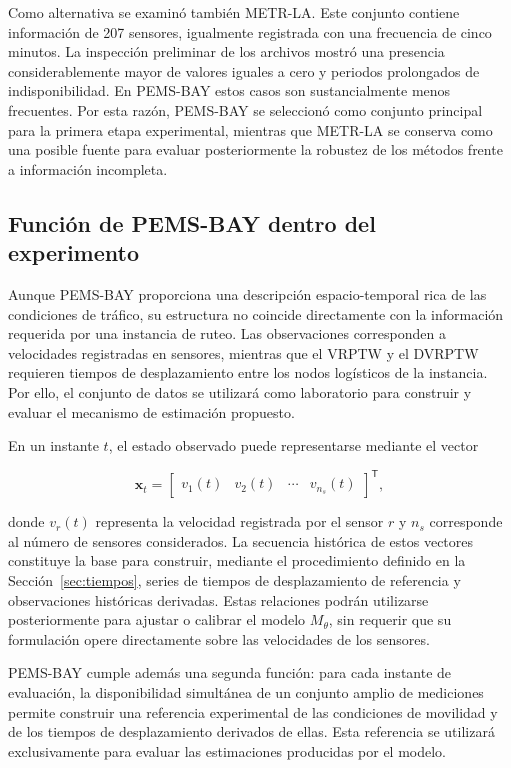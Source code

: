 \documentclass[11pt]{article}
\begin{document}
Como alternativa se examinó también METR-LA. Este conjunto contiene
información de 207 sensores, igualmente registrada con una frecuencia de
cinco minutos. La inspección preliminar de los archivos mostró una presencia
considerablemente mayor de valores iguales a cero y periodos prolongados de
indisponibilidad. En PEMS-BAY estos casos son sustancialmente menos frecuentes.
Por esta razón, PEMS-BAY se seleccionó como conjunto principal para la primera
etapa experimental, mientras que METR-LA se conserva como una posible fuente
para evaluar posteriormente la robustez de los métodos frente a información
incompleta.

\subsection{Función de PEMS-BAY dentro del experimento}

Aunque PEMS-BAY proporciona una descripción espacio-temporal rica de las
condiciones de tráfico, su estructura no coincide directamente con la
información requerida por una instancia de ruteo. Las observaciones
corresponden a velocidades registradas en sensores, mientras que el VRPTW y
el DVRPTW requieren tiempos de desplazamiento entre los nodos logísticos de
la instancia. Por ello, el conjunto de datos se utilizará como laboratorio
para construir y evaluar el mecanismo de estimación propuesto.

En un instante \(t\), el estado observado puede representarse mediante el
vector

\[
\mathbf{x}_t=
\begin{bmatrix}
v_1(t) & v_2(t) & \cdots & v_{n_s}(t)
\end{bmatrix}^{\mathsf T},
\]

donde \(v_r(t)\) representa la velocidad registrada por el sensor \(r\) y
\(n_s\) corresponde al número de sensores considerados. La secuencia histórica
de estos vectores constituye la base para construir, mediante el procedimiento
definido en la Sección~\ref{sec:tiempos}, series de tiempos de desplazamiento de referencia y
observaciones históricas derivadas. Estas relaciones podrán utilizarse
posteriormente para ajustar o calibrar el modelo \(M_{\theta}\), sin requerir
que su formulación opere directamente sobre las velocidades de los sensores.

PEMS-BAY cumple además una segunda función: para cada instante de evaluación,
la disponibilidad simultánea de un conjunto amplio de mediciones permite
construir una referencia experimental de las condiciones de movilidad y de
los tiempos de desplazamiento derivados de ellas. Esta referencia se
utilizará exclusivamente para evaluar las estimaciones producidas por el
modelo.
\end{document}
